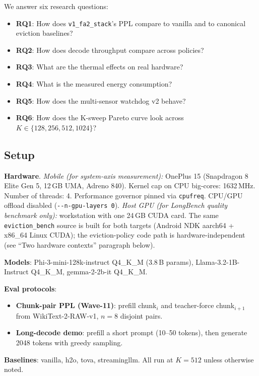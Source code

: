 \documentclass[sigconf, anonymous=false, screen=true]{acmart}
\begin{document}
We answer six research questions:

\begin{itemize}
\item \textbf{RQ1}: How does \texttt{v1\_fa2\_stack}'s PPL compare to vanilla and to canonical eviction baselines?
\item \textbf{RQ2}: How does decode throughput compare across policies?
\item \textbf{RQ3}: What are the thermal effects on real hardware?
\item \textbf{RQ4}: What is the measured energy consumption?
\item \textbf{RQ5}: How does the multi-sensor watchdog v2 behave?
\item \textbf{RQ6}: How does the K-sweep Pareto curve look across $K \in \{128, 256, 512, 1024\}$?
\end{itemize}

\subsection{Setup}

\textbf{Hardware}. \emph{Mobile (for system-axis measurement):} OnePlus 15 (Snapdragon 8 Elite Gen 5, 12\,GB UMA, Adreno 840). Kernel cap on CPU big-cores: 1632\,MHz. Number of threads: 4. Performance governor pinned via \texttt{cpufreq}. CPU/GPU offload disabled (\texttt{-{}-n-gpu-layers 0}). \emph{Host GPU (for LongBench quality benchmark only):} workstation with one 24\,GB CUDA card. The same \texttt{eviction\_bench} source is built for both targets (Android NDK aarch64 + x86\_64 Linux CUDA); the eviction-policy code path is hardware-independent (see ``Two hardware contexts'' paragraph below).

\textbf{Models}: Phi-3-mini-128k-instruct Q4\_K\_M (3.8\,B params), Llama-3.2-1B-Instruct Q4\_K\_M, gemma-2-2b-it Q4\_K\_M.

\textbf{Eval protocols}:
\begin{itemize}
\item \textbf{Chunk-pair PPL (Wave-11)}: prefill chunk$_i$ and teacher-force chunk$_{i+1}$ from WikiText-2-RAW-v1, $n{=}8$ disjoint pairs.
\item \textbf{Long-decode demo}: prefill a short prompt (10--50 tokens), then generate 2048 tokens with greedy sampling.
\end{itemize}

\textbf{Baselines}: vanilla, h2o, tova, streamingllm. All run at $K{=}512$ unless otherwise noted.
\end{document}
